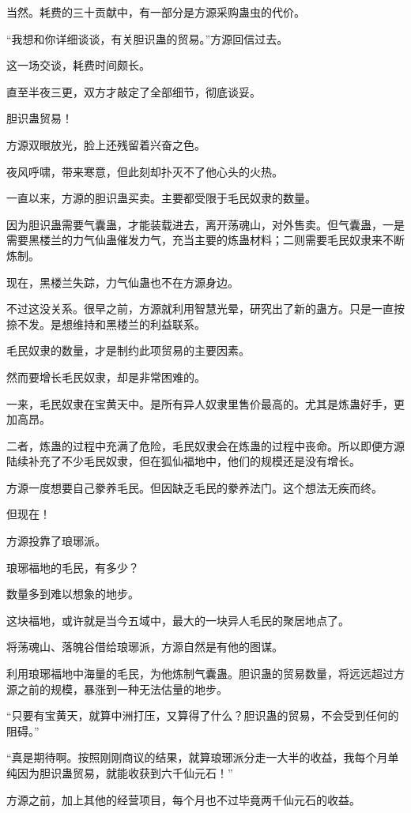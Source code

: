 \begin{this_body}
当然。耗费的三十贡献中，有一部分是方源采购蛊虫的代价。

“我想和你详细谈谈，有关胆识蛊的贸易。”方源回信过去。

这一场交谈，耗费时间颇长。

直至半夜三更，双方才敲定了全部细节，彻底谈妥。

胆识蛊贸易！

方源双眼放光，脸上还残留着兴奋之色。

夜风呼啸，带来寒意，但此刻却扑灭不了他心头的火热。

一直以来，方源的胆识蛊买卖。主要都受限于毛民奴隶的数量。

因为胆识蛊需要气囊蛊，才能装载进去，离开荡魂山，对外售卖。但气囊蛊，一是需要黑楼兰的力气仙蛊催发力气，充当主要的炼蛊材料；二则需要毛民奴隶来不断炼制。

现在，黑楼兰失踪，力气仙蛊也不在方源身边。

不过这没关系。很早之前，方源就利用智慧光晕，研究出了新的蛊方。只是一直按捺不发。是想维持和黑楼兰的利益联系。

毛民奴隶的数量，才是制约此项贸易的主要因素。

然而要增长毛民奴隶，却是非常困难的。

一来，毛民奴隶在宝黄天中。是所有异人奴隶里售价最高的。尤其是炼蛊好手，更加高昂。

二者，炼蛊的过程中充满了危险，毛民奴隶会在炼蛊的过程中丧命。所以即便方源陆续补充了不少毛民奴隶，但在狐仙福地中，他们的规模还是没有增长。

方源一度想要自己豢养毛民。但因缺乏毛民的豢养法门。这个想法无疾而终。

但现在！

方源投靠了琅琊派。

琅琊福地的毛民，有多少？

数量多到难以想象的地步。

这块福地，或许就是当今五域中，最大的一块异人毛民的聚居地点了。

将荡魂山、落魄谷借给琅琊派，方源自然是有他的图谋。

利用琅琊福地中海量的毛民，为他炼制气囊蛊。胆识蛊的贸易数量，将远远超过方源之前的规模，暴涨到一种无法估量的地步。

“只要有宝黄天，就算中洲打压，又算得了什么？胆识蛊的贸易，不会受到任何的阻碍。”

“真是期待啊。按照刚刚商议的结果，就算琅琊派分走一大半的收益，我每个月单纯因为胆识蛊贸易，就能收获到六千仙元石！”

方源之前，加上其他的经营项目，每个月也不过毕竟两千仙元石的收益。


\end{this_body}
